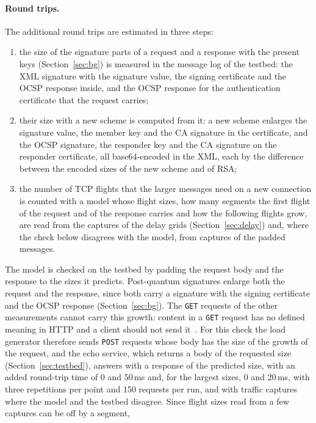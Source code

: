 \documentclass[conference,a4paper]{IEEEtran}
\newcommand{\newtext}[1]{{\color{blue}#1}}
\begin{document}
{\paragraph{Round trips.} The additional round trips are estimated in three steps:
\begin{enumerate}
  \item the size of the signature parts of a request and a response with the present keys
  (Section~\ref{sec:bg}) is measured in the message log of the testbed: the XML signature with the
  signature value, the signing certificate and the OCSP response inside, and the OCSP response for the
  authentication certificate that the request carries;
  \item their size with a new scheme is computed from it: a new scheme enlarges the signature value,
  the member key and the CA signature in the certificate, and the OCSP signature, the responder key and
  the CA signature on the responder certificate, all base64-encoded in the XML, each by the difference
  between the encoded sizes of the new scheme and of RSA;
  \item the number of TCP flights that the larger messages need on a new connection is counted with a
  model whose flight sizes, how many segments the first flight of the request and of the response
  carries and how the following flights grow, are read from the captures of the delay grids
  (Section~\ref{sec:delay}) \newtext{and, where the check below disagrees with the model, from
  captures of the padded messages}.
\end{enumerate}
The model is checked on the testbed by padding the request body and the response to the sizes it
predicts\newtext{. Post-quantum signatures enlarge both the request and the response, since both
carry a signature with the signing certificate and the OCSP response (Section~\ref{sec:bg}). The
\texttt{GET} requests of the other measurements cannot carry this growth: content in a \texttt{GET}
request has no defined meaning in HTTP and a client should not send it~\cite[Sec.~9.3.1]{rfc9110}.
For this check the load generator therefore sends \texttt{POST} requests whose body has the size of
the growth of the request, and the echo service, which returns a body of the requested size
(Section~\ref{sec:testbed}), answers with a response of the predicted size}, with an added
round-trip time of 0 and 50\,ms and, for the largest sizes, 0 and 20\,ms,
with three repetitions per point and 150 requests per run, and with traffic captures where the model
and the testbed disagree. \newtext{Since flight sizes read from a few captures can be off by a segment,
}}
\end{document}
